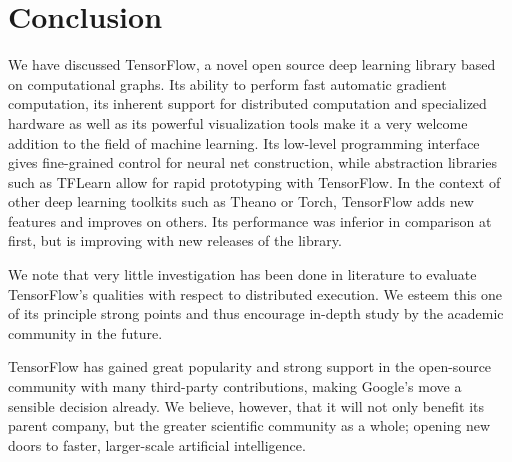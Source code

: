 \section{Conclusion}\label{sec:conclusion}

We have discussed TensorFlow, a novel open source deep learning library based on
computational graphs. Its ability to perform fast automatic gradient
computation, its inherent support for distributed computation and specialized
hardware as well as its powerful visualization tools make it a very welcome
addition to the field of machine learning. Its low-level programming interface
gives fine-grained control for neural net construction, while abstraction
libraries such as TFLearn allow for rapid prototyping with TensorFlow.  In the
context of other deep learning toolkits such as Theano or Torch, TensorFlow adds
new features and improves on others. Its performance was inferior in comparison
at first, but is improving with new releases of the library.

We note that very little investigation has been done in literature to evaluate
TensorFlow's qualities with respect to distributed execution. We esteem this one
of its principle strong points and thus encourage in-depth study by the academic
community in the future.

TensorFlow has gained great popularity and strong support in the open-source
community with many third-party contributions, making Google's move a sensible
decision already. We believe, however, that it will not only benefit its parent
company, but the greater scientific community as a whole; opening new doors to
faster, larger-scale artificial intelligence.

